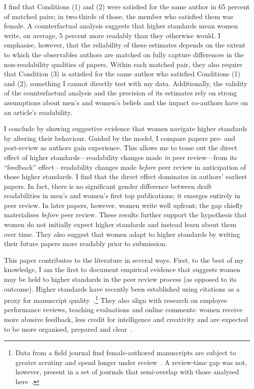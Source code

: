 I find that Conditions (1) and (2) were satisfied for the same author in 65 percent of matched pairs; in two-thirds of those, the member who satisfied them was female. A counterfactual analysis suggests that higher standards mean women write, on average, 5 percent more readably than they otherwise would. I emphasise, however, that the reliability of these estimates depends on the extent to which the observables authors are matched on fully capture differences in the non-readability qualities of papers. Within each matched pair, they also require that Condition (3) is satisfied for the same author who satisfied Conditions (1) and (2), something I cannot directly test with my data. Additionally, the validity of the counterfactual analysis and the precision of its estimates rely on strong assumptions about men's and women's beliefs and the impact co-authors have on an article's readability.

I conclude by showing suggestive evidence that women navigate higher standards by altering their behaviour. Guided by the model, I compare papers pre- and post-review as authors gain experience. This allows me to tease out the direct effect of higher standards---readability changes made \emph{in} peer review---from its ``feedback'' effect---readability changes made \emph{before} peer review in anticipation of those higher standards. I find that the direct effect dominates in authors' earliest papers. In fact, there is no significant gender difference between draft readabilities in men's and women's first top publications; it emerges entirely in peer review. In later papers, however, women write well upfront; the gap chiefly materialises \emph{before} peer review. These results further support the hypothesis that women do not initially expect higher standards and instead learn about them over time. They also suggest that women adapt to higher standards by writing their future papers more readably prior to submission.

This paper contributes to the literature in several ways. First, to the best of my knowledge, I am the first to document empirical evidence that suggests women may be held to higher standards in the peer review process (as opposed to its outcome). Higher standards have recently been established using citations as a proxy for manuscript quality~\citep{Card2020,Moon2020,Grossbard2018}.\footnote{Data from a field journal find female-authored manuscripts are subject to greater scrutiny and spend longer under review~\citep{Alexander2021}. A review-time gap was not, however, present in a set of journals that semi-overlap with those analysed here~\citep{Card2020}.} They also align with research on employee performance reviews, teaching evaluations and online comments: women receive more abusive feedback, less credit for intelligence and creativity and are expected to be more organised, prepared and clear~\citep[see, \emph{e.g.},][]{Boring2017,Mengel2017,Correll2016,Gardiner2016,Wu2019}.

